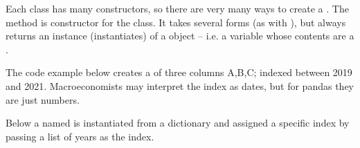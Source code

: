 \documentclass[letterpaper,10pt,english]{jupyterBook}
\begin{document}
\sphinxAtStartPar
Each class has many constructors, so there are very many ways to create a . The  method is constructor for the  class. It takes several forms (as with ), but always returns an instance (instantiates) of a  object – i.e. a variable whose contents are a .

\sphinxAtStartPar
The code example below creates a  of three columns A,B,C; indexed between 2019 and 2021.  Macroeconomists may interpret the index as dates, but for pandas they are just numbers.

\sphinxAtStartPar
Below a  named  is instantiated from a dictionary and assigned a specific index by passing a list of years as the index.
\end{document}
